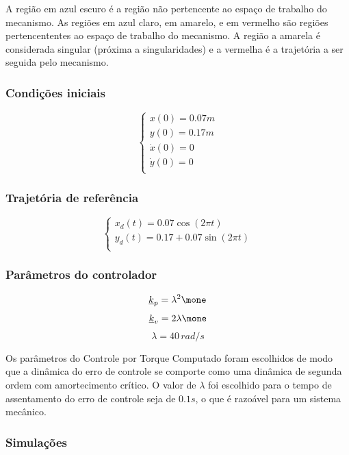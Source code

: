 \documentclass[]{politex}
\begin{document}
A região em azul escuro é a região não pertencente ao espaço de trabalho do mecanismo. As regiões em azul claro, em amarelo, e em vermelho são regiões pertencententes ao espaço de trabalho do mecanismo. A região a amarela é considerada singular (próxima a singularidades) e a vermelha é a trajetória a ser seguida pelo mecanismo.

\subsubsection{Condições iniciais}
\begin{equation}
\begin{cases}
x(0) = 0.07 m\\
y(0) = 0.17 m \\
\dot{x}(0) = 0 \\
\dot{y}(0) = 0 \\
\end{cases}
\end{equation}

\subsubsection{Trajetória de referência}
\begin{equation}
\begin{cases}
x_{d}(t) = 0.07 \cos(2 \pi t) \\
y_{d}(t) = 0.17 + 0.07 \sin(2 \pi t) \\
\end{cases}
\end{equation}

\subsubsection{Parâmetros do controlador}
$$ \underline{k}_p = \lambda^2 \mone $$
$$ \underline{k}_v = 2\lambda \mone $$
$$ \lambda = 40 \, rad/s $$

Os parâmetros do Controle por Torque Computado foram escolhidos de modo que a dinâmica do erro de controle se comporte como uma dinâmica de segunda ordem com amortecimento crítico. O valor de $\lambda$ foi escolhido para o tempo de assentamento do erro de controle seja de $0.1s$, o que é razoável para um sistema mecânico.

\subsubsection{Simulações}
\end{document}
